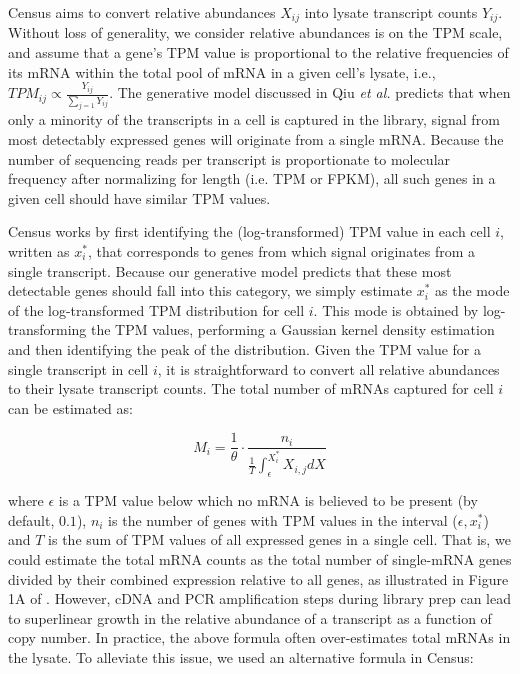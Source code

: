 \documentclass[10pt,oneside]{article}\usepackage[]{graphicx}\usepackage[]{color}
\begin{document}
Census aims to convert relative abundances $X_{ij}$ into lysate transcript counts $Y_{ij}$. Without loss of generality, we consider relative abundances is on the TPM scale, and assume that a gene's TPM value is proportional to the relative frequencies of its mRNA within the total pool of mRNA in a given cell's lysate, i.e., $TPM_{ij} \propto \frac{Y_{ij}}{\sum_{j = 1}Y_{ij}}$.  The generative model discussed in Qiu \emph{et al.} predicts that when only a minority of the transcripts in a cell is captured in the library, signal from most detectably expressed genes will originate from a single mRNA.  Because the number of sequencing reads per transcript is proportionate to molecular frequency after normalizing for length (i.e. TPM or FPKM), all such genes in a given cell should have similar TPM values.  

Census works by first identifying the (log-transformed) TPM value in each cell $i$, written as $x_i^*$, that corresponds to genes from which signal originates from a single transcript. Because our generative model predicts that these most detectable genes should fall into this category, we simply estimate $x_i^*$ as the mode of the log-transformed TPM distribution for cell $i$. This mode is obtained by log-transforming the TPM values, performing a Gaussian kernel density estimation and then identifying the peak of the distribution. Given the TPM value for a single transcript in cell $i$, it is straightforward to convert all relative abundances to their lysate transcript counts. The total number of mRNAs captured for cell $i$ can be estimated as:

\begin{equation}
M_i = \frac{1}{\theta} \cdot \frac{n_i}{\frac{1}{T} \int_{\epsilon}^{X_i^*}X_{i,j}dX}
\end{equation}

where $\epsilon$ is a TPM value below which no mRNA is believed to be present (by default, $0.1$), $n_i$ is the number of genes with TPM values in the interval ($\epsilon, x_i^*$) and $T$ is the sum of TPM values of all expressed genes in a single cell. That is, we could estimate the total mRNA counts as the total number of single-mRNA genes divided by their combined expression relative to all genes, as illustrated in Figure 1A of \cite{qiu2017single}. However, cDNA and PCR amplification steps during library prep can lead to superlinear growth in the relative abundance of a transcript as a function of copy number. In practice, the above formula often over-estimates total mRNAs in the lysate. To alleviate this issue, we used an alternative formula in Census:
\end{document}
